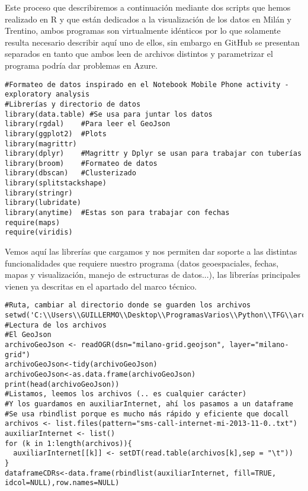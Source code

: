 \documentclass[11pt, a4paper]{article} %
\begin{document}
Este proceso que describiremos a continuación mediante dos scripts que hemos realizado en R y que están dedicados a la visualización de los datos en Milán y Trentino, ambos programas son virtualmente idénticos por lo que solamente resulta necesario describir aquí uno de ellos, sin embargo en GitHub se presentan separados en tanto que ambos leen de archivos distintos y parametrizar el programa podría dar problemas en Azure.
\begin{lstlisting}
#Formateo de datos inspirado en el Notebook Mobile Phone activity - exploratory analysis
#Librerías y directorio de datos
library(data.table) #Se usa para juntar los datos
library(rgdal)    #Para leer el GeoJson
library(ggplot2)  #Plots
library(magrittr) 
library(dplyr)    #Magrittr y Dplyr se usan para trabajar con tuberías
library(broom)    #Formateo de datos
library(dbscan)   #Clusterizado
library(splitstackshape)
library(stringr)
library(lubridate)
library(anytime)  #Estas son para trabajar con fechas
require(maps)
require(viridis)
\end{lstlisting}
Vemos aquí las librerías que cargamos y nos permiten dar soporte a las distintas funcionalidades que requiere nuestro programa (datos geoespaciales, fechas, mapas y visualización, manejo de estructuras de datos...), las librerías principales vienen ya descritas en el apartado del marco técnico.
\begin{lstlisting}
#Ruta, cambiar al directorio donde se guarden los archivos
setwd('C:\\Users\\GUILLERMO\\Desktop\\ProgramasVarios\\Python\\TFG\\archivos')
#Lectura de los archivos
#El GeoJson
archivoGeoJson <- readOGR(dsn="milano-grid.geojson", layer="milano-grid")
archivoGeoJson<-tidy(archivoGeoJson)
archivoGeoJson<-as.data.frame(archivoGeoJson)
print(head(archivoGeoJson))
#Listamos, leemos los archivos (.. es cualquier carácter) 
#Y los guardamos en auxiliarInternet, ahí los pasamos a un dataframe
#Se usa rbindlist porque es mucho más rápido y eficiente que docall
archivos <- list.files(pattern="sms-call-internet-mi-2013-11-0..txt")
auxiliarInternet <- list()
for (k in 1:length(archivos)){
  auxiliarInternet[[k]] <- setDT(read.table(archivos[k],sep = "\t"))
}
dataframeCDRs<-data.frame(rbindlist(auxiliarInternet, fill=TRUE, idcol=NULL),row.names=NULL)
\end{lstlisting}
\end{document}
